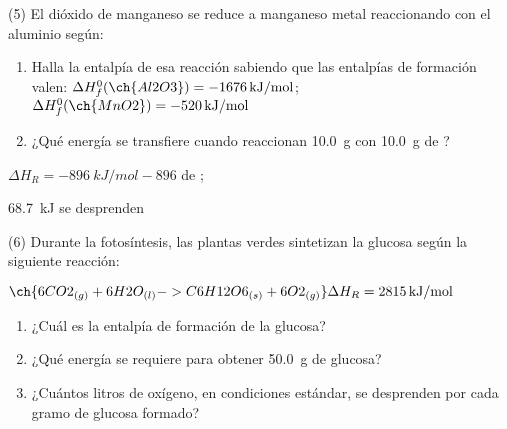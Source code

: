 \documentclass[10pt]{article}
\begin{document}
\begin{multicols}{2}
\begin{exercise}[
    tags    = {},
    topics  = {química,química básica},
    source  = {FQ 1B MGH 2016, p85, e26},
  ]

  (5) El dióxido de manganeso se reduce a manganeso metal reaccionando
  con el aluminio según:


  \begin{enumerate}
    \item Halla la entalpía de esa reacción sabiendo que las entalpías
    de formación valen:
    \( \Delta H^0_f (\ch{Al2O3}) = \SI{-1676}{kJ/mol} \); \( \Delta H^0_f (\ch{MnO2}) = \SI{-520}{kJ/mol} \)
    \item ¿Qué energía se transfiere cuando reaccionan \SI{10.0}{\gram}
     con \SI{10.0}{\gram} de ?
  \end{enumerate}
\end{exercise}

\begin{solution}
  \begin{enumerate*}
    \item \( \Delta H_R = \SI{-896}{kJ/mol}-896 \) de ;
    \item \SI{68.7}{kJ} se desprenden
  \end{enumerate*}
\end{solution}





\begin{exercise}[
    tags    = {},
    topics  = {química,química básica},
    source  = {FQ 1B MGH 2016, p85, e26},
  ]

  (6) Durante la fotosíntesis, las plantas verdes sintetizan la glucosa
  según la siguiente reacción:

  \( \ch{6 CO2_{(g)} + 6 H2O_{(l)} -> C6H12O6_{(s)} + 6 O2_{(g)}} \Delta H_R = \SI{2815}{kJ/mol} \)

  \begin{enumerate}
    \item ¿Cuál es la entalpía de formación de la glucosa?
    \item ¿Qué energía se requiere para obtener \SI{50.0}{\gram} de glucosa?
    \item ¿Cuántos litros de oxígeno, en condiciones estándar, se desprenden por cada gramo de glucosa formado?
  \end{enumerate}


\end{exercise}
\end{multicols}
\end{document}
